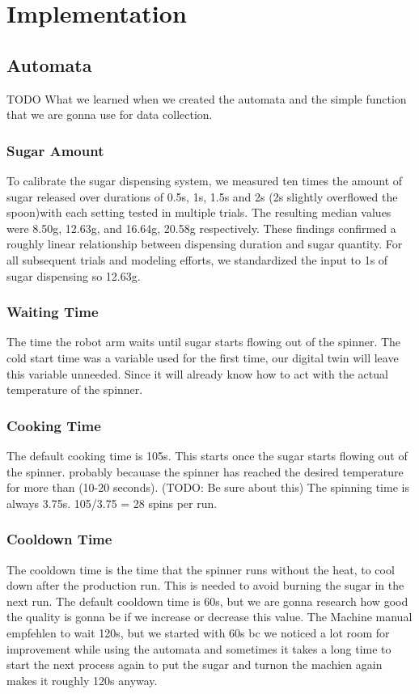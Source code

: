 \chapter{Implementation}
\label{sec:implementation}

\section{Automata}
TODO What we learned when we created the automata and the simple function that we are gonna use for data collection.

\subsection{Sugar Amount}\label{subsec:sugar-amount}
To calibrate the sugar dispensing system, we measured ten times the amount of sugar released over durations of 0.5s, 1s, 1.5s and 2s (2s slightly overflowed the spoon)with each setting tested in multiple trials. The resulting median values were 8.50g, 12.63g, and 16.64g, 20.58g respectively. These findings confirmed a roughly linear relationship between dispensing duration and sugar quantity. For all subsequent trials and modeling efforts, we standardized the input to 1s of sugar dispensing so 12.63g.

\subsection{Waiting Time}
The time the robot arm waits until sugar starts flowing out of the spinner. The cold start time was a variable used for the first time, our digital twin will leave this variable unneeded. Since it will already know how to act with the actual temperature of the spinner.

\subsection{Cooking Time}
The default cooking time is 105s. This starts once the sugar starts flowing out of the spinner. probably becauase the spinner has reached the desired temperature for more than (10-20 seconds). (TODO: Be sure about this)
The spinning time is always 3.75s.
105/3.75 = 28 spins per run.

\subsection{Cooldown Time}
The cooldown time is the time that the spinner runs without the heat, to cool down after the production run. This is needed to avoid burning the sugar in the next run. The default cooldown time is 60s, but we are gonna research how good the quality is gonna be if we increase or decrease this value. 
The Machine manual empfehlen to wait 120s, but we started with 60s bc we noticed a lot room for improvement while using the automata and sometimes it takes a long time to start the next process again to put the sugar and turnon the machien again makes it roughly 120s anyway.

